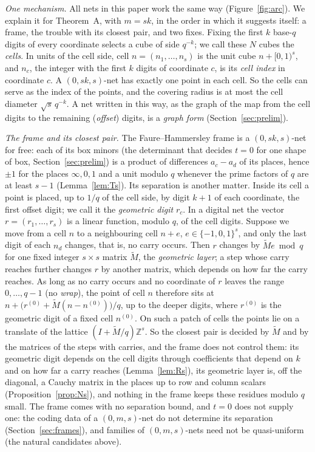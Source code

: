 \documentclass[11pt]{amsart}
\theoremstyle{definition}
\theoremstyle{plain}
\newcommand{\Z}{\mathbb{Z}}
\begin{document}
\emph{One mechanism.} All nets in this paper work the same way (Figure~\ref{fig:arc}). We explain it for Theorem~A, with $m=sk$, in the order in which it suggests itself: a frame, the trouble with its closest pair, and two fixes. Fixing the first $k$ base-$q$ digits of every coordinate selects a cube of side $q^{-k}$; we call these $N$ cubes the \emph{cells}. In units of the cell side, cell $n=(n_1,\dots,n_s)$ is the unit cube $n+[0,1)^s$, and $n_c$, the integer with the first $k$ digits of coordinate $c$, is its \emph{cell index} in coordinate $c$. A $(0,sk,s)$-net has exactly one point in each cell. So the cells can serve as the index of the points, and the covering radius is at most the cell diameter $\sqrt s\,q^{-k}$. A net written in this way, as the graph of the map from the cell digits to the remaining (\emph{offset}) digits, is a \emph{graph form} (Section~\ref{sec:prelim}).

\emph{The frame and its closest pair.} The Faure--Hammersley frame is a $(0,sk,s)$-net for free: each of its box minors (the determinant that decides $t=0$ for one shape of box, Section~\ref{sec:prelim}) is a product of differences $a_c-a_d$ of its places, hence $\pm1$ for the places $\infty,0,1$ and a unit modulo $q$ whenever the prime factors of $q$ are at least $s-1$ (Lemma~\ref{lem:Ts}). Its separation is another matter. Inside its cell a point is placed, up to $1/q$ of the cell side, by digit $k+1$ of each coordinate, the first offset digit; we call it the \emph{geometric digit} $r_c$. In a digital net the vector $r=(r_1,\dots,r_s)$ is a linear function, modulo $q$, of the cell digits. Suppose we move from a cell $n$ to a neighbouring cell $n+e$, $e\in\{-1,0,1\}^s$, and only the last digit of each $n_d$ changes, that is, no carry occurs. Then $r$ changes by $\tilde Me\bmod q$ for one fixed integer $s\times s$ matrix $\tilde M$, the \emph{geometric layer}; a step whose carry reaches further changes $r$ by another matrix, which depends on how far the carry reaches. As long as no carry occurs and no coordinate of $r$ leaves the range $0,\dots,q-1$ (no \emph{wrap}), the point of cell $n$ therefore sits at $n+\bigl(r^{(0)}+\tilde M(n-n^{(0)})\bigr)/q$, up to the deeper digits, where $r^{(0)}$ is the geometric digit of a fixed cell $n^{(0)}$. On such a patch of cells the points lie on a translate of the lattice $(I+\tilde M/q)\Z^s$. So the closest pair is decided by $\tilde M$ and by the matrices of the steps with carries, and the frame does not control them: its geometric digit depends on the cell digits through coefficients that depend on $k$ and on how far a carry reaches (Lemma~\ref{lem:Rs}), its geometric layer is, off the diagonal, a Cauchy matrix in the places up to row and column scalars (Proposition~\ref{prop:Ns}), and nothing in the frame keeps these residues modulo $q$ small. The frame comes with no separation bound, and $t=0$ does not supply one: the coding data of a $(0,m,s)$-net do not determine its separation (Section~\ref{sec:frames}), and families of $(0,m,s)$-nets need not be quasi-uniform (the natural candidates above).
\end{document}
